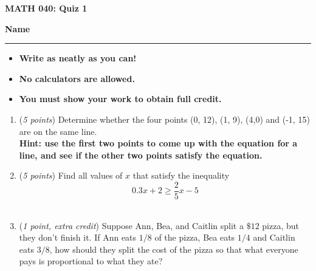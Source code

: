 \documentclass[12 pt]{article}
\begin{document}
  \begin{center}
    \textbf{\hfill MATH 040: Quiz 1} \\
  \end{center}
  \medskip

  \noindent
  \textbf{Name}\ \rule{3.5in}{.4pt} \hfill
  \vspace{.1in}
  \hspace*{0.2in}
  \begin{itemize}
    \item \textbf{Write as neatly as you can!}
    \item \textbf{No calculators are allowed.}
    \item \textbf{You must show your work to obtain full credit.}
  \end{itemize}

	\medskip
  \noindent

  \begin{enumerate}
    \item (\textit{5 points})
    Determine whether the four points (0, 12), (1, 9), (4,0) and (-1, 15) are
    on the same line. \\
    \textbf{Hint: use the first two points to come up with the equation for a
    line, and see if the other two points satisfy the equation.}

		\pagebreak
		\item (\textit{5 points}) Find all values of $x$ that satisfy the inequality \[
      0.3x + 2 \geq \frac{2}5x - 5
    \]
    \vspace{3in}\\
    \item (\textit{1 point, extra credit})
    Suppose Ann, Bea, and Caitlin split a $\$12$ pizza, but they don't finish it.
    If Ann eats $1/8$ of the pizza, Bea eats $1/4$ and Caitlin eats $3/8$,
    how should they split the cost of the pizza so that what everyone pays is
    proportional to what they ate?
  \end{enumerate}
\end{document}
